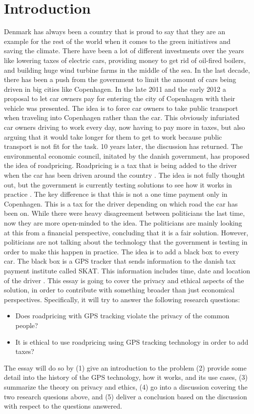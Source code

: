 \section{Introduction}
Denmark has always been a country that is proud to say that they are an example for the rest of the world when it comes to the green initiatives and saving the climate. There have been a lot of different investments over the years like lowering taxes of electric cars, providing money to get rid of oil-fired boilers, and building huge wind turbine farms in the middle of the sea. In the last decade, there has been a push from the government to limit the amount of cars being driven in big cities like Copenhagen. In the late 2011 and the early 2012 a proposal to let car owners pay for entering the city of Copenhagen with their vehicle was presented. The idea is to force car owners to take public transport when traveling into Copenhagen rather than the car. This obviously infuriated car owners driving to work every day, now having to pay more in taxes, but also arguing that it would take longer for them to get to work because public transport is not fit for the task. 10 years later, the discussion has returned. The environmental economic council, initated by the danish government, has proposed the idea of roadpricing. Roadpricing is a tax that is being added to the driver when the car has been driven around the country \cite{borsen:2013}. The idea is not fully thought out, but the government is currently testing solutions to see how it works in practice \cite{kosmopol:2022}. The key difference is that this is not a one time payment only in Copenhagen. This is a tax for the driver depending on which road the car has been on. While there were heavy disagreement between politicians the last time, now they are more open-minded to the idea. The politicians are mainly looking at this from a financial perspective, concluding that it is a fair solution. However, politicians are not talking about the technology that the government is testing in order to make this happen in practice. The idea is to add a black box to every car. The black box is a GPS tracker that sends information to the danish tax payment institute called SKAT. This information includes time, date and location of the driver \cite{jylland:2011}.
This essay is going to cover the privacy and ethical aspects of the solution, in order to contribute with something broader than just economical perspectives. Specifically, it will try to answer the following research questions:
\begin{itemize}
    \item Does roadpricing with GPS tracking violate the privacy of the common people?
    \item It is ethical to use roadpricing using GPS tracking technology in order to add taxes?
\end{itemize}
The essay will do so by (1) give an introduction to the problem (2) provide some detail into the history of the GPS technology, how it works, and its use cases, (3) summarize the theory on privacy and ethics, (4) go into a discussion covering the two research quesions above, and (5) deliver a conclusion based on the discussion with respect to the questions answered.